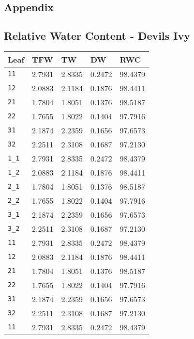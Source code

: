 \begin{appendices}
  \chapter{Appendix}
  \section{Relative Water Content - Devils Ivy}
  \begin{table}[htb]
    \centering
    \begin{tabular}{lllll}
      \toprule
      \textbf{Leaf} & \textbf{TFW} & \textbf{TW} & \textbf{DW} & \textbf{RWC} \\
      \midrule
        \texttt{11} & 2.7931 & 2.8335 & 0.2472 & 98.4379 \\
        \texttt{12} & 2.0883 & 2.1184 & 0.1876 & 98.4411 \\
        \texttt{21} & 1.7804 & 1.8051 & 0.1376 & 98.5187 \\
        \texttt{22} & 1.7655 & 1.8022 & 0.1404 & 97.7916 \\
        \texttt{31} & 2.1874 & 2.2359 & 0.1656 & 97.6573 \\
        \texttt{32} & 2.2511 & 2.3108 & 0.1687 & 97.2130 \\
        \texttt{1\_1} & 2.7931 & 2.8335 & 0.2472 & 98.4379 \\
        \texttt{1\_2} & 2.0883 & 2.1184 & 0.1876 & 98.4411 \\
        \texttt{2\_1} & 1.7804 & 1.8051 & 0.1376 & 98.5187 \\
        \texttt{2\_2} & 1.7655 & 1.8022 & 0.1404 & 97.7916 \\
        \texttt{3\_1} & 2.1874 & 2.2359 & 0.1656 & 97.6573 \\
        \texttt{3\_2} & 2.2511 & 2.3108 & 0.1687 & 97.2130 \\
        \texttt{11} & 2.7931 & 2.8335 & 0.2472 & 98.4379 \\
        \texttt{12} & 2.0883 & 2.1184 & 0.1876 & 98.4411 \\
        \texttt{21} & 1.7804 & 1.8051 & 0.1376 & 98.5187 \\
        \texttt{22} & 1.7655 & 1.8022 & 0.1404 & 97.7916 \\
        \texttt{31} & 2.1874 & 2.2359 & 0.1656 & 97.6573 \\
        \texttt{32} & 2.2511 & 2.3108 & 0.1687 & 97.2130 \\
        \texttt{11} & 2.7931 & 2.8335 & 0.2472 & 98.4379 \\

\end{tabular}
\end{table}
\end{appendices}
